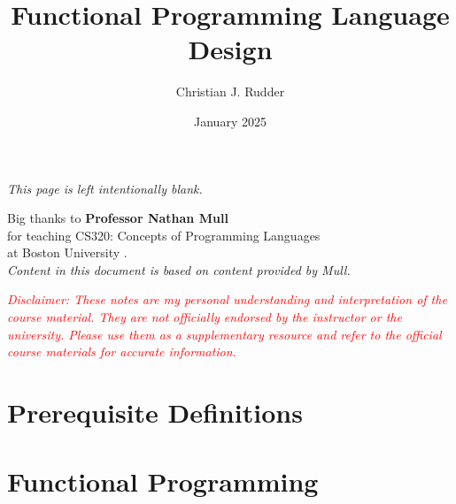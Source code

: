 \documentclass{memoir}
\title{Functional Programming Language Design}
\author{Christian J. Rudder}
\date{January 2025}
\begin{document}
\maketitle
\setcounter{tocdepth}{2}

\tableofcontents

\newpage
\thispagestyle{empty}
\mbox{}
\vfill
\begin{center}
    \textit{This page is left intentionally blank.}
\end{center}
\vfill
\newpage
\thispagestyle{empty}
\mbox{}
\vfill
\begin{center}
    \Large{Big thanks to \textbf{Professor Nathan Mull}}\\
    \normalsize 
    for teaching CS320: Concepts of Programming Languages\\
    at Boston University \cite{mull_cs320}.\\
    \textit{Content in this document is based on content provided by Mull.}\\
    \vfill
    \begin{center}
        \textcolor{red}{\textit{Disclaimer: These notes are my personal understanding and interpretation of the course material. 
        They are not officially endorsed by the instructor or the university. Please use them as a supplementary resource and refer 
        to the official course materials for accurate information.}}
    \end{center}
\end{center}

\vfill

\chapter*{Prerequisite Definitions}


\chapter{Functional Programming}

% 




\end{document}
